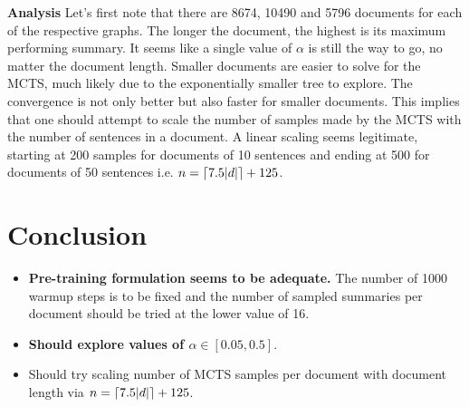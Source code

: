 \vspace{10pt}

\noindent\textbf{Analysis}
Let's first note that there are 8674, 10490 and 5796 documents for each of the respective graphs.
The longer the document, the highest is its maximum performing summary.
It seems like a single value of $\alpha$ is still the way to go, no matter the document length.
Smaller documents are easier to solve for the MCTS, much likely due to the exponentially smaller tree to explore.
The convergence is not only better but also faster for smaller documents.
This implies that one should attempt to scale the number of samples made by the MCTS with the number of sentences in a document.
A linear scaling seems legitimate, starting at 200 samples for documents of 10 sentences and ending at 500 for documents of 50 sentences i.e. $n = \lceil7.5|d|\rceil + 125$.

\section*{Conclusion}

\begin{itemize}
    \item \textbf{Pre-training formulation seems to be adequate.} The number of 1000 warmup steps is to be fixed and the number of sampled summaries per document should be tried at the lower value of 16.
    \item \textbf{Should explore values of $\alpha \in [0.05, 0.5]$}.
    \item Should try scaling number of MCTS samples per document with document length via $n = \lceil7.5|d|\rceil + 125$.
\end{itemize}

